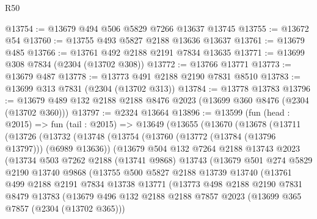 \begin{lexlean}{R50}
\begin{coremodule}
@13754 := @13679 @494 @506 @5829 @7266 @13637 @13745
@13755 := @13672 @54
@13760 := @13755 @493 @5827 @2188 @13636 @13637
@13761 := @13679 @485
@13766 := @13761 @492 @2188 @2191 @7834 @13635
@13771 := @13699 @308 @7834 (@2304 (@13702 @308))
@13772 := @13766 @13771
@13773 := @13679 @487
@13778 := @13773 @491 @2188 @2190 @7831 @8510
@13783 := @13699 @313 @7831 (@2304 (@13702 @313))
@13784 := @13778 @13783
@13796 := @13679 @489 @132 @2188 @2188 @8476 @2023 (@13699 @360 @8476 (@2304 (@13702 @360)))
@13797 := @2324 @13664
@13896 := @13599
    (fun (head : @2015) =>
    fun (tail : @2015) =>
    @13649
      (@13655
        (@13670
          (@13678
            (@13711
              (@13726
                (@13732
                  (@13748
                    (@13754
                      (@13760 (@13772 (@13784 (@13796 @13797))) (@6989 @13636))
                      (@13679
                        @504
                        @132
                        @7264
                        @2188
                        @13743
                        @2023
                        (@13734
                          @503
                          @7262
                          @2188
                          (@13741 @9868)
                          @13743
                          (@13679
                            @501
                            @274
                            @5829
                            @2190
                            @13740
                            @9868
                            (@13755
                              @500
                              @5827
                              @2188
                              @13739
                              @13740
                              (@13761
                                @499
                                @2188
                                @2191
                                @7834
                                @13738
                                @13771
                                (@13773
                                  @498
                                  @2188
                                  @2190
                                  @7831
                                  @8479
                                  @13783
                                  (@13679
                                    @496
                                    @132
                                    @2188
                                    @2188
                                    @7857
                                    @2023
                                    (@13699 @365 @7857 (@2304 (@13702 @365)))

\end{coremodule}
\end{lexlean}
